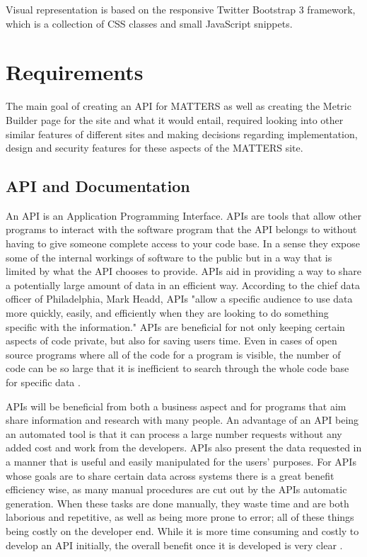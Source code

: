 			Visual representation is based on the responsive Twitter Bootstrap 3 framework, 
			which is a collection of CSS classes and small JavaScript snippets. 

	\section{Requirements}

		The main goal of creating an API for MATTERS as well as creating the Metric 
		Builder page for the site and what it would entail, required looking into other 
		similar features of different sites and making decisions regarding implementation,
		design and security features for these aspects of the MATTERS site.

	\subsection{API and Documentation}

		An API is an Application Programming Interface. APIs are tools that allow other 
		programs to interact with the software program that the API belongs to without 
		having to give someone complete access to your code base. In a sense they expose 
		some of the internal workings of software to the public but in a way that is 
		limited by what the API chooses to provide. APIs aid in providing a way to share 
		a potentially large amount of data in an efficient way. According to the chief 
		data officer of Philadelphia, Mark Headd, APIs "allow a specific audience to use 
		data more quickly, easily, and efficiently when they are looking to do something 
		specific with the information." APIs are beneficial for not only keeping certain 
		aspects of code private, but also for saving users time. Even in cases of open 
		source programs where all of the code for a program is visible, the number of 
		code can be so large that it is inefficient to search through the whole code base 
		for specific data \cite{govapi}. 

		APIs will be beneficial from both a business aspect and for programs that aim share 
		information and research with many people. An advantage of an API being an automated 
		tool is that it can process a large number requests without any added cost and work 
		from the developers. APIs also present the data requested in a manner that is useful 
		and easily manipulated for the users' purposes. For APIs whose goals are to share 
		certain data across systems there is a great benefit efficiency wise, as many manual 
		procedures are cut out by the APIs automatic generation. When these tasks are done 
		manually, they waste time and are both laborious and repetitive, as well as being more 
		prone to error; all of these things being costly on the developer end. While it is more 
		time consuming and costly to develop an API initially, the overall benefit once it is 
		developed is very clear \cite{govapi}.

